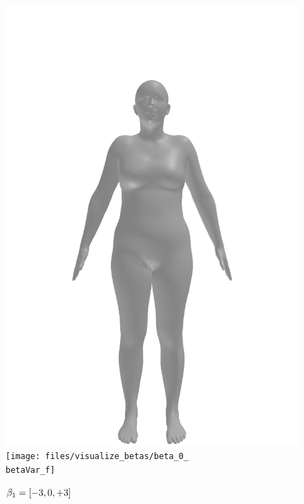 \begin{figure}[ht!]
\begin{minipage}[b]{\textwidth}
        \includegraphics[width=\imgWidth]{files/visualize_betas/baseline_f}
        \texttt{[image: files/visualize\_betas/beta\_0\_\\betaVar\_f]}
        \caption{$\beta_1 = [-3, 0, +3]$}
        \label{fig:beta-1-vis}
    \end{minipage}
\end{figure}

